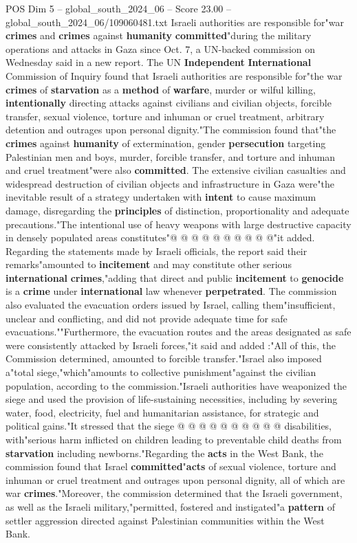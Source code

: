 \begin{textsample}{POS Dim 5 – global\_south\_2024\_06 – Score 23.00 – global\_south\_2024\_06/109060481.txt}  \label{ex:f5_pos_222}
Israeli authorities are responsible for"war \textbf{crimes} and \textbf{crimes} against \textbf{humanity} \textbf{committed}"during the military operations and attacks in Gaza since Oct. 7, a UN-backed commission on Wednesday said in a new report.
The UN \textbf{Independent} \textbf{International} Commission of Inquiry found that Israeli authorities are responsible for"the war \textbf{crimes} of \textbf{starvation} as a \textbf{method} of \textbf{warfare}, murder or wilful killing, \textbf{intentionally} directing attacks against civilians and civilian objects, forcible transfer, sexual violence, torture and inhuman or cruel treatment, arbitrary detention and outrages upon personal dignity."The commission found that"the \textbf{crimes} against \textbf{humanity} of extermination, gender \textbf{persecution} targeting Palestinian men and boys, murder, forcible transfer, and torture and inhuman and cruel treatment"were also \textbf{committed}.
The extensive civilian casualties and widespread destruction of civilian objects and infrastructure in Gaza were"the inevitable result of a strategy undertaken with \textbf{intent} to cause maximum damage, disregarding the \textbf{principles} of distinction, proportionality and adequate precautions."The intentional use of heavy weapons with large destructive capacity in densely populated areas constitutes"@ @ @ @ @ @ @ @ @ @"it added.
Regarding the statements made by Israeli officials, the report said their remarks"amounted to \textbf{incitement} and may constitute other serious \textbf{international} \textbf{crimes},"adding that direct and public \textbf{incitement} to \textbf{genocide} is a \textbf{crime} under \textbf{international} law whenever \textbf{perpetrated}.
The commission also evaluated the evacuation orders issued by Israel, calling them"insufficient, unclear and conflicting, and did not provide adequate time for safe evacuations.""Furthermore, the evacuation routes and the areas designated as safe were consistently attacked by Israeli forces,"it said and added :"All of this, the Commission determined, amounted to forcible transfer."Israel also imposed a"total siege,"which"amounts to collective punishment"against the civilian population, according to the commission."Israeli authorities have weaponized the siege and used the provision of life-sustaining necessities, including by severing water, food, electricity, fuel and humanitarian assistance, for strategic and political gains."It stressed that the siege @ @ @ @ @ @ @ @ @ @ disabilities, with"serious harm inflicted on children leading to preventable child deaths from \textbf{starvation} including newborns."Regarding the \textbf{acts} in the West Bank, the commission found that Israel \textbf{committed}"\textbf{acts} of sexual violence, torture and inhuman or cruel treatment and outrages upon personal dignity, all of which are war \textbf{crimes}."Moreover, the commission determined that the Israeli government, as well as the Israeli military,"permitted, fostered and instigated"a \textbf{pattern} of settler aggression directed against Palestinian communities within the West Bank.

\end{textsample}
